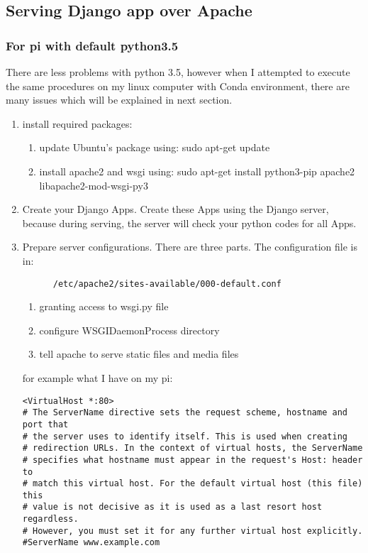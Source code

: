 \documentclass[UTF8,fancyhdr,a4paper]{ctexart}
\begin{document}
\subsection{ Serving Django app over Apache}
\subsubsection{For pi with default python3.5}
There are less problems with python 3.5, however when I attempted to execute the same procedures on my linux computer with Conda environment, there are many issues which will be explained in next section.
\begin{enumerate}
      \item install required packages:
            \begin{enumerate}
                  \item update Ubuntu's package using: sudo apt-get update
                  \item install apache2 and wsgi using: sudo apt-get install python3-pip apache2 libapache2-mod-wsgi-py3
            \end{enumerate}
      \item Create your Django Apps. Create these Apps using the Django server, because during serving, the server will check your python codes for all Apps.
      \item Prepare server configurations. There are three parts. The configuration file is in: \begin{verbatim}
      /etc/apache2/sites-available/000-default.conf
    \end{verbatim}
            \begin{enumerate}
                  \item granting access to wsgi.py file
                  \item configure WSGIDaemonProcess directory
                  \item tell apache to serve static files and media files
            \end{enumerate}
            for example what I have on my pi:
            \begin{verbatim}
<VirtualHost *:80>
# The ServerName directive sets the request scheme, hostname and port that
# the server uses to identify itself. This is used when creating
# redirection URLs. In the context of virtual hosts, the ServerName
# specifies what hostname must appear in the request's Host: header to
# match this virtual host. For the default virtual host (this file) this
# value is not decisive as it is used as a last resort host regardless.
# However, you must set it for any further virtual host explicitly.
#ServerName www.example.com


\end{verbatim}
\end{enumerate}
\end{document}

